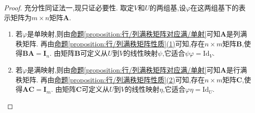 \documentclass[../../main.tex]{subfiles}%
\begin{document}
\begin{proof}
充分性同{\color{blue}证法一},现只证必要性. 取定\(V\)和\(U\)的两组基,设\(\varphi\)在这两组基下的表示矩阵为\(m\times n\)矩阵\(\boldsymbol{A}\).
\begin{enumerate}[(1)]
\item 若\(\varphi\)是单映射,则由\hyperref[proposition:行/列满秩矩阵对应满/单射]{命题\ref{proposition:行/列满秩矩阵对应满/单射}}可知\(\boldsymbol{A}\)是列满秩矩阵. 再由\hyperref[proposition:行/列满秩矩阵性质]{命题\ref{proposition:行/列满秩矩阵性质}(1)}可知,存在\(n\times m\)矩阵\(\boldsymbol{B}\),使得\(\boldsymbol{B}\boldsymbol{A}=\boldsymbol{I}_n\). 由矩阵\(\boldsymbol{B}\)可定义从\(U\)到\(V\)的线性映射\(\psi\),它适合\(\psi\varphi=\text{Id}_V\).

\item 若\(\varphi\)是满映射,则由\hyperref[proposition:行/列满秩矩阵对应满/单射]{命题\ref{proposition:行/列满秩矩阵对应满/单射}}可知\(\boldsymbol{A}\)是行满秩矩阵. 再由\hyperref[proposition:行/列满秩矩阵性质]{命题\ref{proposition:行/列满秩矩阵性质}(2)}可知,存在\(n\times m\)矩阵\(\boldsymbol{C}\),使得\(\boldsymbol{A}\boldsymbol{C}=\boldsymbol{I}_m\). 由矩阵\(\boldsymbol{C}\)可定义从\(U\)到\(V\)的线性映射\(\eta\),它适合\(\varphi\eta=\text{Id}_U\).
\end{enumerate}

\end{proof}
\end{document}
